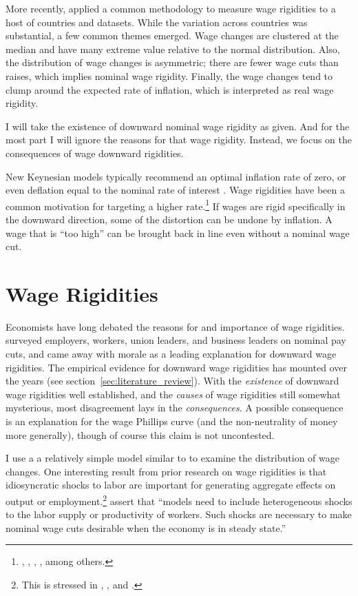 \documentclass[12pt,a4paper]{scrartcl}            %
\begin{document}
More recently, \cite{dickens_et_al_2006} applied a common methodology to measure wage rigidities to a host of countries and datasets.
While the variation across countries was substantial, a few common themes emerged.
Wage changes are clustered at the median and have many extreme value relative to the normal distribution.
Also, the distribution of wage changes is asymmetric; there are fewer wage cuts than raises, which implies nominal wage rigidity.
Finally, the wage changes tend to clump around the expected rate of inflation, which is interpreted as real wage rigidity.

I will take the existence of downward nominal wage rigidity as given.
And for the most part I will ignore the reasons for that wage rigidity.
Instead, we focus on the consequences of wage downward rigidities.

New Keynesian models typically recommend an optimal inflation rate of zero, or even deflation equal to the nominal rate of interest \citep{schmitt-grohe_uribe_2010}.
Wage rigidities have been a common motivation for targeting a higher rate.\footnote{\cite{tobin_1972}, \cite{akerlof_dickens_perry_1996}, \cite{kim_ruge-murcia_2011}, \cite{coibon_gorodnichenko_wieland_2012}, among others.}
If wages are rigid specifically in the downward direction, some of the distortion can be undone by inflation.
A wage that is ``too high'' can be brought back in line even without a nominal wage cut.

\section{Wage Rigidities}
\label{sec:introduction}

Economists have long debated the reasons for and importance of wage rigidities.
\cite{bewley_1999} surveyed employers, workers, union leaders, and business leaders on nominal pay cuts, and came away with morale as a leading explanation for downward wage rigidities.
The empirical evidence for downward wage rigidities has mounted over the years (see section~\ref{sec:literature_review}).
With the \emph{existence} of downward wage rigidities well established, and the \emph{causes} of wage rigidities still somewhat mysterious, most disagreement lays in the \emph{consequences}.
A possible consequence is an explanation for the wage Phillips curve (and the non-neutrality of money more generally), though of course this claim is not uncontested. %

I use a a relatively simple model similar to \cite{daly_hobijn_2013} to examine the distribution of wage changes.  %
One interesting result from prior research on wage rigidities is that idiosyncratic shocks to labor are important for generating aggregate effects on output or employment.\footnote{
This is stressed in \cite{elsby_2009}, \cite{benigno_ricci_2011}, and \cite{daly_hobijn_2013}.}
\cite{daly_hobijn_2013} assert that ``models need to include heterogeneous shocks to the labor supply or productivity of workers. Such shocks are necessary to make nominal wage cuts desirable when the economy is in steady state.''
\end{document}
